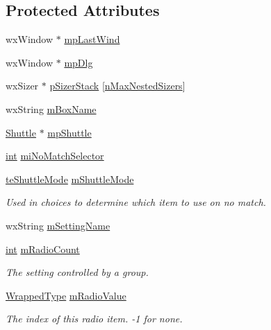 \subsection*{Protected Attributes}
\begin{DoxyCompactItemize}
\item 
wx\+Window $\ast$ \hyperlink{class_shuttle_gui_base_a2c08d2097364121d9b29de626e4fbd79}{mp\+Last\+Wind}
\item 
wx\+Window $\ast$ \hyperlink{class_shuttle_gui_base_aea7401af88ba1164527a04888fd40da0}{mp\+Dlg}
\item 
wx\+Sizer $\ast$ \hyperlink{class_shuttle_gui_base_aecb78352e89e697636aa26f4183fd4e9}{p\+Sizer\+Stack} \mbox{[}\hyperlink{_shuttle_gui_8h_a679cb631860b750fc390195398e3ab0b}{n\+Max\+Nested\+Sizers}\mbox{]}
\item 
wx\+String \hyperlink{class_shuttle_gui_base_a7499eefd5965e635f08ea05d0ced0b70}{m\+Box\+Name}
\item 
\hyperlink{class_shuttle}{Shuttle} $\ast$ \hyperlink{class_shuttle_gui_base_a76673f4627fcdabed6c79df5184aebde}{mp\+Shuttle}
\item 
\hyperlink{xmltok_8h_a5a0d4a5641ce434f1d23533f2b2e6653}{int} \hyperlink{class_shuttle_gui_base_afc20399d84a16501bad6f69627778474}{mi\+No\+Match\+Selector}
\item 
\hyperlink{_shuttle_gui_8h_a0c8bf96cca5e5b020b22818e8490b964}{te\+Shuttle\+Mode} \hyperlink{class_shuttle_gui_base_af1822d58f1e11d43b98522b063c6b519}{m\+Shuttle\+Mode}
\begin{DoxyCompactList}\small\item\em Used in choices to determine which item to use on no match. \end{DoxyCompactList}\item 
wx\+String \hyperlink{class_shuttle_gui_base_a2bb4fe6c146c25c06d410235579a3659}{m\+Setting\+Name}
\item 
\hyperlink{xmltok_8h_a5a0d4a5641ce434f1d23533f2b2e6653}{int} \hyperlink{class_shuttle_gui_base_ada23c70f67c02e2c8d83ad4cfd20d666}{m\+Radio\+Count}
\begin{DoxyCompactList}\small\item\em The setting controlled by a group. \end{DoxyCompactList}\item 
\hyperlink{class_wrapped_type}{Wrapped\+Type} \hyperlink{class_shuttle_gui_base_a442c9153302934143136af472620dfe5}{m\+Radio\+Value}
\begin{DoxyCompactList}\small\item\em The index of this radio item. -\/1 for none. \end{DoxyCompactList}\item 

\end{DoxyCompactItemize}

